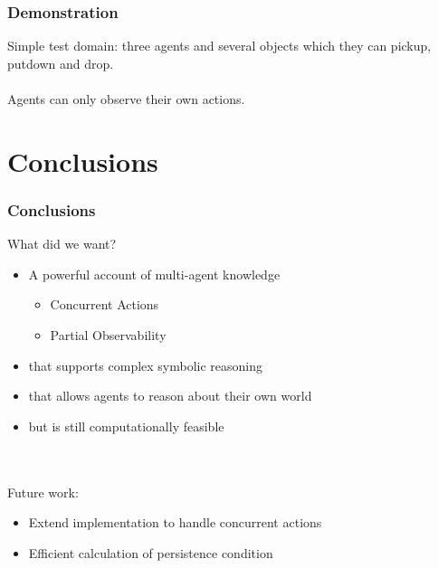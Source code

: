 \documentclass{beamer}
\begin{document}
\begin{frame}
\frametitle{Demonstration}
Simple test domain: three agents and several objects which they can pickup,
putdown and drop.
\ \\
\ \\
Agents can only observe their own actions.
\end{frame}

\section{Conclusions}

\begin{frame}
\frametitle{Conclusions}
What did we want?
\begin{itemize}
\item A powerful account of multi-agent knowledge
  \begin{itemize}
  \item Concurrent Actions
  \item Partial Observability
  \end{itemize}
\item that supports complex symbolic reasoning
\item that allows agents to reason about their own world
\item but is still computationally feasible
\end{itemize}
\ \\
\ \\
\pause
Future work:
\begin{itemize}
  \item Extend implementation to handle concurrent actions
  \item Efficient calculation of persistence condition
\end{itemize}

\end{frame}
\end{document}
